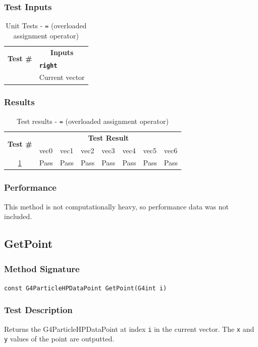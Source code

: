 \documentclass[12pt]{article}
\newcounter{TestCounter}
\begin{document}
	\subsubsection{Test Inputs}
		\begin{table}[H]
		\centering
		\caption{Unit Tests - \texttt{=} (overloaded assignment operator)}\label{OperatorEquals_unit}
		\begin{tabular}{cl}
		\toprule
		\multirow{2}{*}{\bf Test \#}  & \multicolumn{1}{c}{\bf Inputs}\\
		& \bf \texttt{right}\\\midrule
		{TestCounter}\arabic{TestCounter}\label{OperatorEquals_0} & Current vector\\
		\bottomrule
		\end{tabular}
		\end{table}
	\subsubsection{Results}
		\begin{table}[h]
		\centering
		\caption{Test results - \texttt{=} (overloaded assignment operator)}\label{OperatorEquals_acc}
		\begin{tabular}{clllllll}
		\toprule
		\multirow{2}{*}{\bf Test \#} & \multicolumn{7}{c}{\bf Test Result}\\
		& vec0 & vec1 & vec2 & vec3 & vec4 & vec5 & vec6\\\midrule
		\ref{OperatorEquals_0} & Pass & Pass & Pass & Pass & Pass & Pass & Pass\\
		\bottomrule
		\end{tabular}
		\end{table}
	\subsubsection{Performance}	
		This method is not computationally heavy, so performance data was not included.
		
\subsection{GetPoint}
	\subsubsection{Method Signature}
	\texttt{const G4ParticleHPDataPoint GetPoint(G4int i)}

	\subsubsection{Test Description}
	Returns the G4ParticleHPDataPoint at index \texttt{i} in the current vector. The \texttt{x} 
	and \texttt{y} values of the point are outputted.
	
\end{document}
